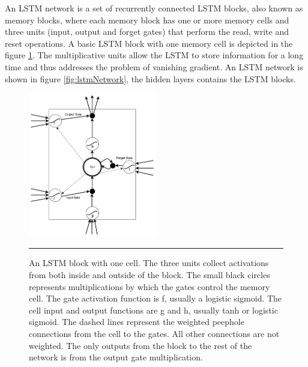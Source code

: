 An LSTM network is a set of recurrently connected LSTM blocks, also known as memory blocks, where
each memory block has one or more memory cells and three units (input, output and forget gates)
that perform the read, write and reset operations. A basic LSTM block with one memory cell is
depicted in the figure \ref{fig:lstmBlock}. The multiplicative units allow the LSTM to store
information for a long time and thus addresses the problem of vanishing gradient. An LSTM network
is shown in figure \ref{fig:lstmNetwork}, the hidden layers contains the LSTM blocks.

\begin{figure}[htbp]
  \centering
    \includegraphics[width=0.5\textwidth,height=0.5\textheight,keepaspectratio]{Figures/lstm-block.pdf}
    \rule{35em}{0.5pt}
  \caption[An LSTM block with one cell]
{An LSTM block with one cell. The three units collect activations from both inside and outside of
the block. The small black circles represents multiplications by which the gates control the
memory cell. The gate activation function is f, usually a logistic sigmoid. The cell input and
output functions are g and h, usually tanh or logistic sigmoid. The dashed lines represent the
weighted peephole connections from the cell to the gates. All other connections are not weighted.
The only outputs from the block to the rest of the network is from the output gate multiplication.}
  \label{fig:lstmBlock}
\end{figure}

